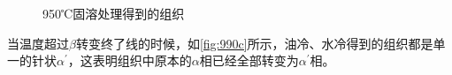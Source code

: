 \begin{figure}[htbp]
{\begin{minipage}[t]{0.33\linewidth}
		\end{minipage}%
	}%
	\centering
	\caption{950℃固溶处理得到的组织}
	\label{fig:950c}
\end{figure}

当温度超过$\beta $转变终了线的时候，如\ref{fig:990c}所示，油冷、水冷得到的组织都是单一的针状$\alpha^\prime$，这表明组织中原本的$\alpha$相已经全部转变为$\alpha^\prime$相。

